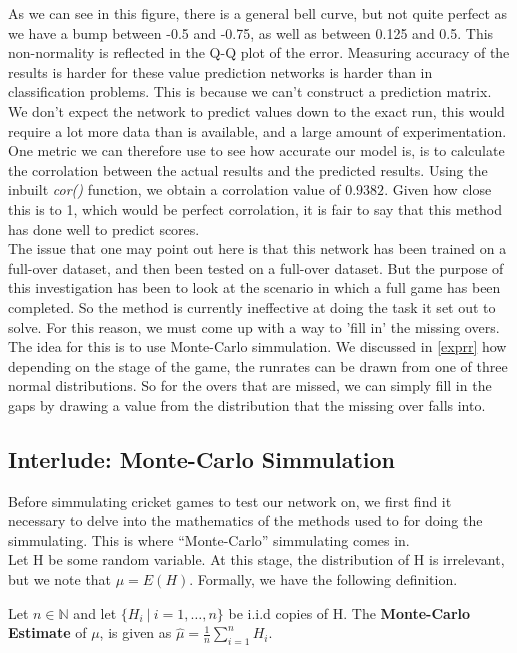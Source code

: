 As we can see in this figure, there is a general bell curve, but not quite perfect as we have a bump between -0.5 and -0.75, as well as between 0.125 and 0.5. This 
non-normality is reflected in the Q-Q plot of the error. Measuring accuracy of the results is harder for these value prediction networks is harder than in classification 
problems. This is because we can't construct a prediction matrix. We don't expect the network to predict values down to the exact run, this would require a lot more 
data than is available, and a large amount of experimentation. One metric we can therefore use to see how accurate our model is, is to calculate 
the corrolation between the actual results and the predicted results. Using the inbuilt \textit{cor()} function, we obtain a corrolation value of 
$0.9382$. Given how close this is to 1, which would be perfect corrolation, it is fair to say that this method has done well to predict scores. \\

The issue that one may point out here is that this network has been trained on a full-over dataset, and then been tested on a full-over dataset. But the purpose of this 
investigation has been to look at the scenario in which a full game has been completed. So the method is currently ineffective at doing the task it set out to solve. For this reason,
we must come up with a way to 'fill in' the missing overs. The idea for this is to use Monte-Carlo simmulation. We discussed in \ref{exprr} how depending on the stage of the game,
the runrates can be drawn from one of three normal distributions. So for the overs that are missed, we can simply fill in the gaps by drawing a value from the distribution that the missing over falls 
into. 

\subsection{Interlude: Monte-Carlo Simmulation}
\label{mcsim}
Before simmulating cricket games to test our network on, we first find it necessary to delve into the mathematics of the methods used to for doing the simmulating. This is where
``Monte-Carlo'' simmulating comes in. \\
Let H be some random variable. At this stage, the distribution of H is irrelevant, but we note that $\mu = E(H)$. Formally, we have the following definition.

\begin{definition}
    Let $n \in \mathbb{N}$ and let $\{H_i \ | \ i =1,\ldots,n\}$ be i.i.d copies of H. The \textbf{Monte-Carlo Estimate} of $\mu$, is given as $\hat{\mu}=\frac{1}{n}\sum_{i=1}^n H_i$.  
\end{definition}

